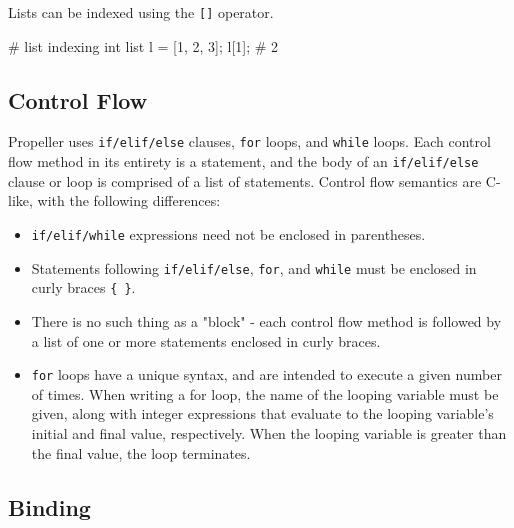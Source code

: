 \noindent Lists can be indexed using the \verb|[]| operator.

\begin{mylisting}
# list indexing
int list l = [1, 2, 3];
l[1];           # 2
\end{mylisting}

\subsection{Control Flow}
Propeller uses \texttt{if/elif/else} clauses, \texttt{for} loops, and \texttt{while} loops.
Each control flow method in its entirety is a statement, and the body of an
\texttt{if/elif/else} clause or loop is comprised of a list of statements. Control flow
semantics are C-like, with the following differences:
\begin{itemize}
    \item \texttt{if/elif/while} expressions need not be enclosed in parentheses.
    \item Statements following \texttt{if/elif/else}, \texttt{for}, and \texttt{while} must
          be enclosed in curly braces \texttt{\{ \}}.
    \item There is no such thing as a "block" - each control flow method is followed by a list
          of one or more statements enclosed in curly braces.
    \item \texttt{for} loops have a unique syntax, and are intended to execute a given number of
          times. When writing a for loop, the name of the looping variable must be given, along
          with integer expressions that evaluate to the looping variable's initial and final
          value, respectively. When the looping variable is greater than the final value, the
          loop terminates.
\end{itemize}



\subsection{Binding}

